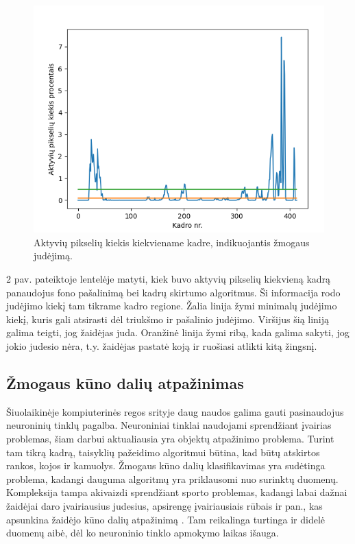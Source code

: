 \documentclass{VUMIFPSbakalaurinis}
\begin{document}
\begin{figure}[H]
    \centering
    \includegraphics[scale=0.8]{img/steps}
    \caption{Aktyvių pikselių kiekis kiekviename kadre, indikuojantis žmogaus judėjimą. }
    \label{img:mlp}
\end{figure}

2 pav. pateiktoje lentelėje matyti, kiek buvo aktyvių pikselių kiekvieną kadrą panaudojus fono pašalinimą bei kadrų skirtumo algoritmus. Ši informacija rodo judėjimo kiekį tam tikrame kadro regione. Žalia linija žymi minimalų judėjimo kiekį, kuris gali atsirasti dėl triukšmo ir pašalinio judėjimo. Viršijus šią liniją galima teigti, jog žaidėjas juda. Oranžinė linija žymi ribą, kada galima sakyti, jog jokio judesio nėra, t.y. žaidėjas pastatė koją ir ruošiasi atlikti kitą žingsnį. 

\subsection{Žmogaus kūno dalių atpažinimas}

Šiuolaikinėje kompiuterinės regos srityje daug naudos galima gauti pasinaudojus neuroninių tinklų pagalba. Neuroniniai tinklai naudojami sprendžiant įvairias problemas, šiam darbui aktualiausia yra objektų atpažinimo problema. Turint tam tikrą kadrą, taisyklių pažeidimo algoritmui būtina, kad būtų atskirtos rankos, kojos ir kamuolys. Žmogaus kūno dalių klasifikavimas yra sudėtinga problema, kadangi dauguma algoritmų yra priklausomi nuo surinktų duomenų. Kompleksija tampa akivaizdi sprendžiant sporto problemas, kadangi labai dažnai žaidėjai daro įvairiausius judesius, apsirengę įvairiausiais rūbais ir pan., kas apsunkina žaidėjo kūno dalių atpažinimą \cite{Andriluka_2014_CVPR}. Tam reikalinga turtinga ir didelė duomenų aibė, dėl ko neuroninio tinklo apmokymo laikas išauga. 
\end{document}
